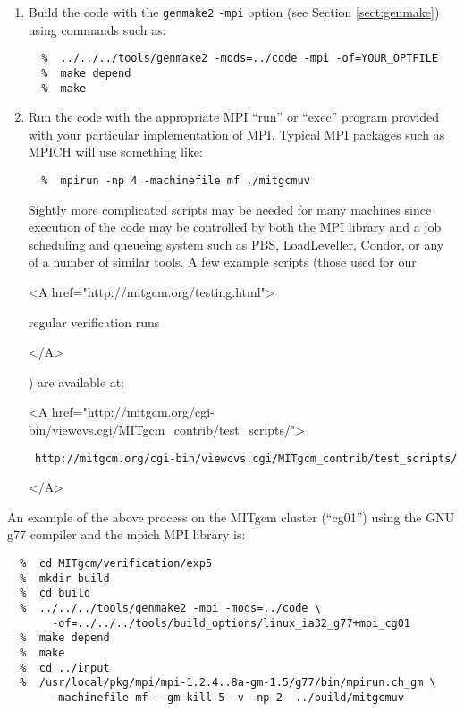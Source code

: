 \begin{enumerate}
\begin{itemize}
  \item \begin{rawhtml} <A
      href="http://www.osc.edu/~pw/mpiexec/">
    \end{rawhtml}
    MPIexec
    \begin{rawhtml} </A> \end{rawhtml}
  \end{itemize}
  
\item Build the code with the \texttt{genmake2} \texttt{-mpi} option
  (see Section \ref{sect:genmake}) using commands such as:
{\footnotesize \begin{verbatim}
  %  ../../../tools/genmake2 -mods=../code -mpi -of=YOUR_OPTFILE
  %  make depend
  %  make
\end{verbatim} }
  
\item Run the code with the appropriate MPI ``run'' or ``exec''
  program provided with your particular implementation of MPI.
  Typical MPI packages such as MPICH will use something like:
\begin{verbatim}
  %  mpirun -np 4 -machinefile mf ./mitgcmuv
\end{verbatim}
  Sightly more complicated scripts may be needed for many machines
  since execution of the code may be controlled by both the MPI
  library and a job scheduling and queueing system such as PBS,
  LoadLeveller, Condor, or any of a number of similar tools.  A few
  example scripts (those used for our \begin{rawhtml} <A
    href="http://mitgcm.org/testing.html"> \end{rawhtml}regular
  verification runs\begin{rawhtml} </A> \end{rawhtml}) are available
  at:
  \begin{rawhtml} <A
    href="http://mitgcm.org/cgi-bin/viewcvs.cgi/MITgcm_contrib/test_scripts/">
  \end{rawhtml}
  {\footnotesize \tt
    http://mitgcm.org/cgi-bin/viewcvs.cgi/MITgcm\_contrib/test\_scripts/ }
  \begin{rawhtml} </A> \end{rawhtml}

\end{enumerate}

An example of the above process on the MITgcm cluster (``cg01'') using
the GNU g77 compiler and the mpich MPI library is:

{\footnotesize \begin{verbatim}
  %  cd MITgcm/verification/exp5
  %  mkdir build
  %  cd build
  %  ../../../tools/genmake2 -mpi -mods=../code \
       -of=../../../tools/build_options/linux_ia32_g77+mpi_cg01
  %  make depend
  %  make
  %  cd ../input
  %  /usr/local/pkg/mpi/mpi-1.2.4..8a-gm-1.5/g77/bin/mpirun.ch_gm \
       -machinefile mf --gm-kill 5 -v -np 2  ../build/mitgcmuv
\end{verbatim} }

